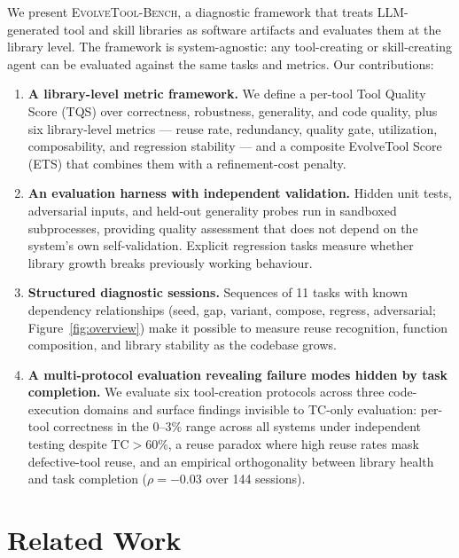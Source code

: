 \documentclass[sigplan,nonacm,natbib=false]{acmart}
\begin{document}
We present \textsc{EvolveTool-Bench}, a diagnostic framework that treats LLM-generated tool and skill libraries as software artifacts and evaluates them at the library level. The framework is system-agnostic: any tool-creating or skill-creating agent can be evaluated against the same tasks and metrics. Our contributions:

\begin{enumerate}
\item \textbf{A library-level metric framework.} We define a per-tool Tool Quality Score (TQS) over correctness, robustness, generality, and code quality, plus six library-level metrics --- reuse rate, redundancy, quality gate, utilization, composability, and regression stability --- and a composite EvolveTool Score (ETS) that combines them with a refinement-cost penalty.

\item \textbf{An evaluation harness with independent validation.} Hidden unit tests, adversarial inputs, and held-out generality probes run in sandboxed subprocesses, providing quality assessment that does not depend on the system's own self-validation. Explicit regression tasks measure whether library growth breaks previously working behaviour.

\item \textbf{Structured diagnostic sessions.} Sequences of 11 tasks with known dependency relationships (seed, gap, variant, compose, regress, adversarial; Figure~\ref{fig:overview}) make it possible to measure reuse recognition, function composition, and library stability as the codebase grows.

\item \textbf{A multi-protocol evaluation revealing failure modes hidden by task completion.} We evaluate six tool-creation protocols across three code-execution domains and surface findings invisible to TC-only evaluation: per-tool correctness in the 0--3\% range across all systems under independent testing despite TC$>$60\%, a reuse paradox where high reuse rates mask defective-tool reuse, and an empirical orthogonality between library health and task completion ($\rho{=}-0.03$ over 144 sessions).
\end{enumerate}

\section{Related Work}
\end{document}
